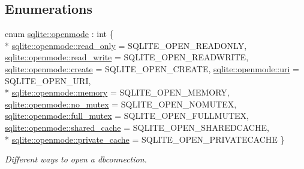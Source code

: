 \subsection*{Enumerations}
\begin{DoxyCompactItemize}
\item 
enum \hyperlink{a00038_ac886eded97b0430b2ab92e2d08fcf938}{sqlite\-::openmode} \-: int \{ \\*
\hyperlink{a00038_ac886eded97b0430b2ab92e2d08fcf938abefe72871b2de8f4f0e20108517e31fe}{sqlite\-::openmode\-::read\-\_\-only} = S\-Q\-L\-I\-T\-E\-\_\-\-O\-P\-E\-N\-\_\-\-R\-E\-A\-D\-O\-N\-L\-Y, 
\hyperlink{a00038_ac886eded97b0430b2ab92e2d08fcf938a06ad287ea83b37a6f9db3d8d10d72c8f}{sqlite\-::openmode\-::read\-\_\-write} = S\-Q\-L\-I\-T\-E\-\_\-\-O\-P\-E\-N\-\_\-\-R\-E\-A\-D\-W\-R\-I\-T\-E, 
\hyperlink{a00038_ac886eded97b0430b2ab92e2d08fcf938a76ea0bebb3c22822b4f0dd9c9fd021c5}{sqlite\-::openmode\-::create} = S\-Q\-L\-I\-T\-E\-\_\-\-O\-P\-E\-N\-\_\-\-C\-R\-E\-A\-T\-E, 
\hyperlink{a00038_ac886eded97b0430b2ab92e2d08fcf938a9305b73d359bd06734fee0b3638079e1}{sqlite\-::openmode\-::uri} = S\-Q\-L\-I\-T\-E\-\_\-\-O\-P\-E\-N\-\_\-\-U\-R\-I, 
\\*
\hyperlink{a00038_ac886eded97b0430b2ab92e2d08fcf938acd69b4957f06cd818d7bf3d61980e291}{sqlite\-::openmode\-::memory} = S\-Q\-L\-I\-T\-E\-\_\-\-O\-P\-E\-N\-\_\-\-M\-E\-M\-O\-R\-Y, 
\hyperlink{a00038_ac886eded97b0430b2ab92e2d08fcf938afb79f3efe5bfb497a2fdd85aca8a73bb}{sqlite\-::openmode\-::no\-\_\-mutex} = S\-Q\-L\-I\-T\-E\-\_\-\-O\-P\-E\-N\-\_\-\-N\-O\-M\-U\-T\-E\-X, 
\hyperlink{a00038_ac886eded97b0430b2ab92e2d08fcf938addc995071d9f139c13354c2839603fac}{sqlite\-::openmode\-::full\-\_\-mutex} = S\-Q\-L\-I\-T\-E\-\_\-\-O\-P\-E\-N\-\_\-\-F\-U\-L\-L\-M\-U\-T\-E\-X, 
\hyperlink{a00038_ac886eded97b0430b2ab92e2d08fcf938a799bb323b5a99b0e122ba5aec784d314}{sqlite\-::openmode\-::shared\-\_\-cache} = S\-Q\-L\-I\-T\-E\-\_\-\-O\-P\-E\-N\-\_\-\-S\-H\-A\-R\-E\-D\-C\-A\-C\-H\-E, 
\\*
\hyperlink{a00038_ac886eded97b0430b2ab92e2d08fcf938a56ffbad7684376d679b1f0dcf37d8bf7}{sqlite\-::openmode\-::private\-\_\-cache} = S\-Q\-L\-I\-T\-E\-\_\-\-O\-P\-E\-N\-\_\-\-P\-R\-I\-V\-A\-T\-E\-C\-A\-C\-H\-E
 \}
\begin{DoxyCompactList}\small\item\em Different ways to open a dbconnection. \end{DoxyCompactList}\end{DoxyCompactItemize}
